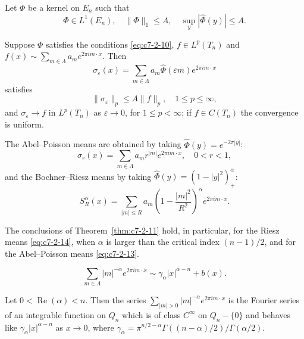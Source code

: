 Let $\Phi$ be a kernel on $E_n$ such that
\begin{equation}\label{eq:c7-2-10}
\Phi \in L^1(E_n), \quad \|\Phi\|_1 \leq A, \quad \sup_{y} |\hat{\Phi}(y)| \leq A.
\end{equation}

\begin{theorem}\label{thm:c7-2-11}
Suppose $\Phi$ satisfies the conditions \eqref{eq:c7-2-10}, $f \in L^p(T_n)$ and $f(x) \sim \sum_{m \in \Lambda} a_m e^{2\pi i m \cdot x}$. Then
\begin{equation}\label{eq:c7-2-12}
\sigma_\varepsilon(x) = \sum_{m \in \Lambda} a_m \hat{\Phi}(\varepsilon m) e^{2\pi i m \cdot x}
\end{equation}
satisfies
\[
\|\sigma_\varepsilon\|_p \leq A \|f\|_p, \quad 1 \leq p \leq \infty,
\]
and $\sigma_\varepsilon \to f$ in $L^p(T_n)$ as $\varepsilon \to 0$, for $1 \leq p < \infty$; if $f \in C(T_n)$ the convergence is uniform.
\end{theorem}

The Abel--Poisson means are obtained by taking $\hat{\Phi}(y) = e^{-2\pi|y|}$:
\begin{equation}\label{eq:c7-2-13}
\sigma_r(x) = \sum_{m \in \Lambda} a_m r^{|m|} e^{2\pi i m \cdot x}, \quad 0 < r < 1,
\end{equation}
and the Bochner--Riesz means by taking $\hat{\Phi}(y) = (1 - |y|^2)_+^\alpha$:
\begin{equation}\label{eq:c7-2-14}
S_R^\alpha(x) = \sum_{|m| \leq R} a_m \left(1 - \frac{|m|^2}{R^2}\right)^\alpha e^{2\pi i m \cdot x}.
\end{equation}

\begin{corollary}\label{cor:c7-2-15}
The conclusions of Theorem~\ref{thm:c7-2-11} hold, in particular, for the Riesz means \eqref{eq:c7-2-14}, when $\alpha$ is larger than the critical index $(n-1)/2$, and for the Abel--Poisson means \eqref{eq:c7-2-13}.
\end{corollary}

\begin{equation}\label{eq:c7-2-16}
\sum_{m \in \Lambda} |m|^{-\alpha} e^{2\pi i m \cdot x} \sim \gamma_\alpha |x|^{\alpha - n} + b(x).
\end{equation}

\begin{theorem}\label{thm:c7-2-17}
Let $0 < \operatorname{Re}(\alpha) < n$. Then the series $\sum_{|m| > 0} |m|^{-\alpha} e^{2\pi i m \cdot x}$ is the Fourier series of an integrable function on $Q_n$ which is of class $C^\infty$ on $Q_n - \{0\}$ and behaves like $\gamma_\alpha |x|^{\alpha - n}$ as $x \to 0$, where $\gamma_\alpha = \pi^{n/2 - \alpha} \Gamma((n - \alpha)/2) / \Gamma(\alpha/2)$.
\end{theorem}

